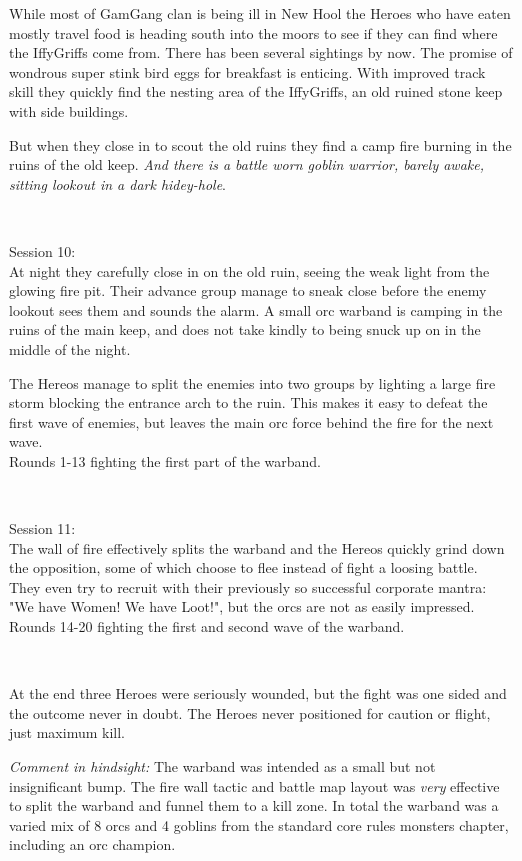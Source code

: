 While most of GamGang clan is being ill in New Hool the Heroes who have eaten mostly travel food is heading south into the moors to see if they can find where the IffyGriffs come from. There has been several sightings by now. The promise of wondrous super stink bird eggs for breakfast is enticing. With improved track skill they quickly find the nesting area of the IffyGriffs, an old ruined stone keep with side buildings.

But when they close in to scout the old ruins they find a camp fire burning in the ruins of the old keep. \textit{And there is a battle worn goblin warrior, barely awake, sitting lookout in a dark hidey-hole}.

\

Session 10:\\                                                           %
At night they carefully close in on the old ruin, seeing the weak light from the glowing fire pit. Their advance group manage to sneak close before the enemy lookout sees them and sounds the alarm. A small orc warband is camping in the ruins of the main keep, and does not take kindly to being snuck up on in the middle of the night.

The Hereos manage to split the enemies into two groups by lighting a large fire storm blocking the entrance arch to the ruin. This makes it easy to defeat the first wave of enemies, but leaves the main orc force behind the fire for the next wave.\\
Rounds 1-13 fighting the first part of the warband.

\

Session 11:\\                                                           %
The wall of fire effectively splits the warband and the Hereos quickly grind down the opposition, some of which choose to flee instead of fight a loosing battle. They even try to recruit with their previously so successful corporate mantra: "We have Women! We have Loot!", but the orcs are not as easily impressed.\\
Rounds 14-20 fighting the first and second wave of the warband.

\

\noindent At the end three Heroes were seriously wounded, but the fight was one sided and the outcome never in doubt. The Heroes never positioned for caution or flight, just maximum kill.

\begin{readoutloud}
\emph{Comment in hindsight:} The warband was intended as a small but not insignificant bump. The fire wall tactic and battle map layout was \emph{very} effective to split the warband and funnel them to a kill zone. In total the warband was a varied mix of 8 orcs and 4 goblins from the standard core rules monsters chapter, including an orc champion.
\end{readoutloud}


